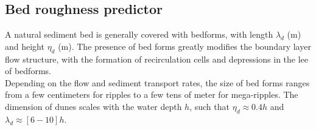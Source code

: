 \subsection{Bed roughness predictor}\label{sec:bedroughpredictor}
A natural sediment bed is generally covered with bedforms, with length $\lambda_d$ (m)
and height $\eta_d$ (m). The presence of bed forms greatly modifies the boundary
layer flow structure, with the formation of recirculation cells and
depressions in the lee of bedforms.\\

Depending on the flow and sediment transport rates, the size of bed
forms ranges from a few centimeters for ripples to a few tens of meter for
mega-ripples. The dimension of dunes scales with the water depth $h$, such that $\eta_d
\approx 0.4 h$ and  $\lambda_d\approx [6-10] h$.\\

